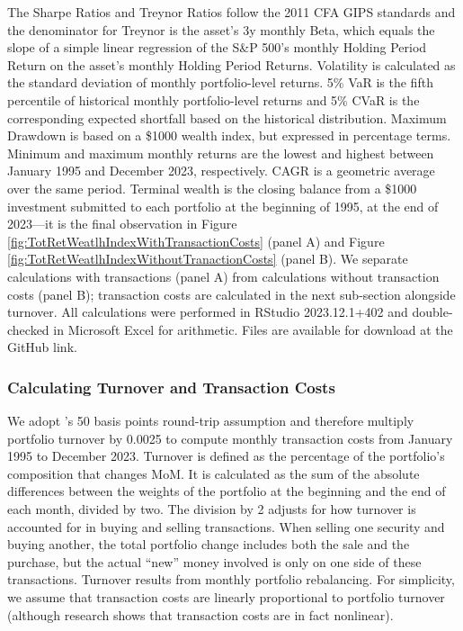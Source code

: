 \documentclass[12pt,letterpaper]{article}
\begin{document}
The Sharpe Ratios and Treynor Ratios follow the 2011 CFA GIPS standards \cite{cfaStandards} and the denominator for Treynor is the asset's 3y monthly Beta, which equals the slope of a simple linear regression of the S\&P 500's monthly Holding Period Return on the asset's monthly Holding Period Returns. Volatility is calculated as the standard deviation of monthly portfolio-level returns. 5\% VaR is the fifth percentile of historical monthly portfolio-level returns and 5\% CVaR is the corresponding expected shortfall based on the historical distribution. Maximum Drawdown is based on a \$1000 wealth index, but expressed in percentage terms. Minimum and maximum monthly returns are the lowest and highest between January 1995 and December 2023, respectively. CAGR is a geometric average over the same period. Terminal wealth is the closing balance from a \$1000 investment submitted to each portfolio at the beginning of 1995, at the end of 2023---it is the final observation in Figure \ref{fig:TotRetWeatlhIndexWithTransactionCosts} (panel A) and Figure \ref{fig:TotRetWeatlhIndexWithoutTranactionCosts} (panel B). We separate calculations with transactions (panel A) from calculations without transaction costs (panel B); transaction costs are calculated in the next sub-section alongside turnover. All calculations were performed in RStudio 2023.12.1+402 and double-checked in Microsoft Excel for arithmetic. Files are available for download at the GitHub link.

\subsubsection{Calculating Turnover and Transaction Costs}
We adopt 's 50 basis points round-trip assumption and therefore multiply portfolio turnover by 0.0025 to compute monthly transaction costs from January 1995 to December 2023. Turnover is defined as the percentage of the portfolio's composition that changes MoM. It is calculated as the sum of the absolute differences between the weights of the portfolio at the beginning and the end of each month, divided by two. The division by 2 adjusts for how turnover is accounted for in buying and selling transactions. When selling one security and buying another, the total portfolio change includes both the sale and the purchase, but the actual “new” money involved is only on one side of these transactions. Turnover results from monthly portfolio rebalancing. For simplicity, we assume that transaction costs are linearly proportional to portfolio turnover (although research shows that transaction costs are in fact nonlinear).
\end{document}
